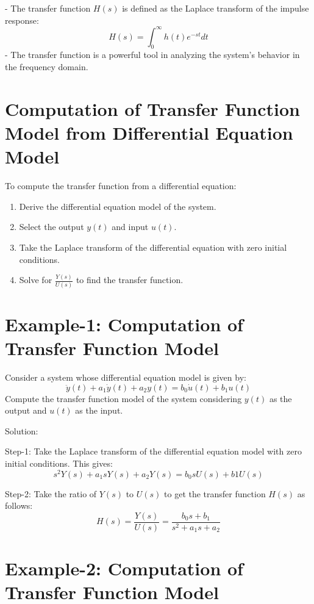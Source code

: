 \documentclass[../notes-main.tex]{subfiles}
\begin{document}
- The transfer function \( H(s) \) is defined as the Laplace transform of the impulse response:
\[
H(s) = \int_{0}^{\infty} h(t) e^{-st} dt
\]
- The transfer function is a powerful tool in analyzing the system's behavior in the frequency domain.

\section{Computation of Transfer Function Model from Differential Equation Model}

To compute the transfer function from a differential equation:
\begin{enumerate}
    \item Derive the differential equation model of the system.
    \item Select the output \( y(t) \) and input \( u(t) \).
    \item Take the Laplace transform of the differential equation with zero initial conditions.
    \item Solve for \(\frac{Y(s)}{U(s)}\) to find the transfer function.
\end{enumerate}

\section{Example-1: Computation of Transfer Function Model}

Consider a system whose differential equation model is given by:
\[
\ddot{y}(t) + a_1\dot{y}(t) + a_2y(t) = b_0\dot{u}(t) + b_1u(t)
\]
Compute the transfer function model of the system considering \( y(t) \) as the output and \( u(t) \) as the input.

Solution:

Step-1: Take the Laplace transform of the differential equation model with zero initial conditions. This gives:
\[
s^2Y(s) + a_1sY(s) + a_2Y(s) = b_0sU(s) + b1U(s)
\]

Step-2: Take the ratio of \( Y(s) \) to \( U(s) \) to get the transfer function \( H(s) \) as follows:
\[
H(s) = \frac{Y(s)}{U(s)} = \frac{b_0s + b_1}{s^2 + a_1s + a_2}
\]
\section{Example-2: Computation of Transfer Function Model}
\end{document}
